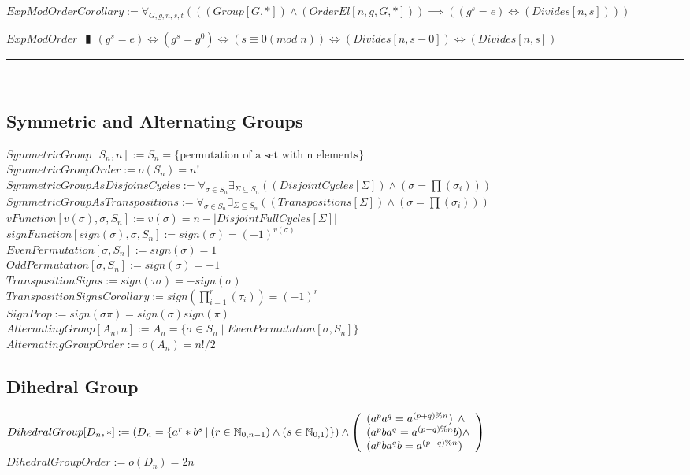 \documentclass{book}
\newcommand{\abr}{:=}
\newcommand{\pipe}{$\phantom{(}\vrectangleblack\phantom{)}$}
\newcommand{\st}{\mathbin{|}}
\begin{document}
$ExpModOrderCorollary \abr \forall_{G, g, n, s, t}(((Group[G, *]) \land (OrderEl[n, g, G, *])) \implies ((g^s = e) \iff (Divides[n, s])))$
\begin{enumerate}
  \lit $ExpModOrder$ \pipe $(g^s = e) \iff (g^s = g^0) \iff (s \equiv 0 (mod \phantom{.} n)) \iff (Divides[n, s - 0]) \iff (Divides[n, s])$
\end{enumerate} \vspace{.75mm} \hrule \vspace{.75mm} \ \\


\subsection{Symmetric and Alternating Groups}
$SymmetricGroup[S_n, n] \abr S_n = \{\text{permutation of a set with n elements}\}$ \\
$SymmetricGroupOrder \abr o(S_n) = n!$ \\
$SymmetricGroupAsDisjoinsCycles \abr \forall_{\sigma \in S_n} \exists_{\Sigma \subseteq S_n}((DisjointCycles[\Sigma]) \land (\sigma = \prod(\sigma_i)))$ \\
$SymmetricGroupAsTranspositions \abr \forall_{\sigma \in S_n} \exists_{\Sigma \subseteq S_n}((Transpositions[\Sigma]) \land (\sigma = \prod(\sigma_i)))$ \\

$vFunction[v(\sigma), \sigma, S_n] \abr v(\sigma) = n - |DisjointFullCycles[\Sigma]|$ \\
$signFunction[sign(\sigma), \sigma, S_n] \abr sign(\sigma) = (-1)^{v(\sigma)}$ \\
$EvenPermutation[\sigma, S_n] \abr sign(\sigma) = 1$ \\
$OddPermutation[\sigma, S_n] \abr sign(\sigma) = -1$ \\

$TranspositionSigns \abr sign(\tau \sigma) = -sign(\sigma)$ \\
$TranspositionSignsCorollary \abr sign(\prod_{i = 1}^{r}(\tau_i)) = (-1)^r$ \\
$SignProp \abr sign(\sigma \pi) = sign(\sigma) sign(\pi)$ \\

$AlternatingGroup[A_n, n] \abr A_n = \{\sigma \in S_n \st EvenPermutation[\sigma, S_n]\}$ \\
$AlternatingGroupOrder \abr o(A_n) = n!/2$ \\

\subsection{Dihedral Group}
$DihedralGroup[D_n, *] \abr (D_n = \{a^r * b^s \st (r \in \mathbb{N}_{0, n - 1}) \land (s \in \mathbb{N}_{0, 1})\}) \land \left(\begin{array}{ll}
  (a^p a^q = a^{(p + q) \% n}) \hfill \land \hfill \\
  (a^p b a^q = a^{(p - q) \% n} b) \hfill \land \hfill \\
  (a^p b a^q b = a^{(p - q) \% n})
\end{array}\right)$ \\
$DihedralGroupOrder \abr o(D_n) = 2 n$ \\
\end{document}
